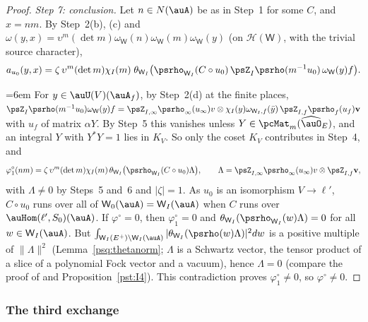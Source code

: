 \documentclass[10pt]{amsart}
\theoremstyle{definition}
\theoremstyle{remark}
\providecommand{\psHS}{\mathcal H}
\providecommand{\psvac}{\mathbf v}
\begin{document}
\begin{proof}
\emph{Step 7: conclusion.} Let $n\in N(\auA)$ be as in Step~1 for some $C$, and $x=nm$. By Step~2(b), (c)
and $\omega(y,x)=\upsilon^m(\det m)\omega_{\mathsf W}(n)\omega_{\mathsf W}(m)\omega_{\mathsf W}(y)$ (on
$\psHS(\mathsf W)$, with the trivial source character),
\[
a_{u_0}(y,x)=\zeta\,\upsilon^m(\det m)\chi_I(m)\;\theta_{\mathsf W_I}\bigl(\psrho_{\mathsf W_I}(C\circ u_0)\,
\psZ_I\psrho(m^{-1}u_0)\,\omega_{\mathsf W}(y)f\bigr).
\]
{\emergencystretch=6em For $y\in\auU(V)(\auA_f)$, by Step~2(d) at the finite places, $\psZ_I\psrho(m^{-1}u_0)\allowbreak \omega_{\mathsf W}(y)f=
\psZ_{I,\infty}\allowbreak \psrho_\infty(u_\infty)v\otimes\chi_I(y)\omega_{\mathsf W_I,f}(\bar y)\,\psZ_{I,f}\psrho_f(u_f)
\psvac$ with $u_f$ of matrix $\alpha Y$. By Step~5 this vanishes unless $Y\in\pcMat_m(\widehat\auO_E)$, and an
integral $Y$ with $Y^*Y=1$ lies in $K_V$. So only the coset $K_V$ contributes in Step~4, and
\[
\varphi^\circ_1(nm)=\zeta\,\upsilon^m(\det m)\chi_I(m)\,\theta_{\mathsf W_I}\bigl(\psrho_{\mathsf W_I}(C\circ u_0)
\Lambda\bigr),\qquad\Lambda=\psZ_{I,\infty}\psrho_\infty(u_\infty)v\otimes\psZ_{I,f}\psvac ,
\]
with $\Lambda\ne0$ by Steps~5 and~6 and $|\zeta|=1$. As $u_0$ is an isomorphism $V\to\ell'$, $C\circ u_0$ runs
over all of $\mathsf W_0(\auA)=\mathsf W_I(\auA)$ when $C$ runs over $\auHom(\ell',S_0)(\auA)$. If
$\varphi^\circ=0$, then $\varphi^\circ_1=0$ and $\theta_{\mathsf W_I}(\psrho_{\mathsf W_I}(w)\Lambda)=0$ for
all $w\in\mathsf W_I(\auA)$. But $\int_{\mathsf W_I(E^+)\backslash\mathsf W_I(\auA)}|\theta_{\mathsf W_I}(\psrho(w)\Lambda)|^2dw$
is a positive multiple of $\|\Lambda\|^2$ (Lemma~\ref{psq:thetanorm}; $\Lambda$ is a Schwartz vector, the tensor product of a
slice of a polynomial Fock vector and a vacuum), hence $\Lambda=0$
(compare the proof of {\cite[Lemma~5.26]{P49}} and Proposition~\ref{pst:I4}). This contradiction proves
$\varphi^\circ_1\ne0$, so $\varphi^\circ\ne0$.\par}
\end{proof}

\subsubsection{The third exchange}\label{pte:ss-third}
\end{document}

